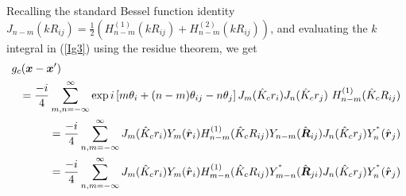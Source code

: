 Recalling the standard Bessel function  identity
${J}_{n-m}(k  R_{ij})=
\frac{1}{2}({H}^{(1)}_{n-m}(k  R_{ij})+ {H}^{(2)}_{n-m}(k  R_{ij}))$, and 
evaluating the $k$ integral in (\ref{Ig3}) using the residue theorem, we get
\begin{eqnarray} \label{Ig4} 
\lefteqn{
g_{c}({\bmi  x} -{\bmi  x}^{\prime} )}\nonumber\\
&&=\frac{-i}{4}
\sum\limits_{ m,n=-\infty }^{ \infty }  \exp i  \left[ m \theta_i + (n-m)
\theta_{ij} -n\theta_j \right]
 {J}_{m}(\hat{K}_{c} r_i) {J}_{n}(\hat{K}_{c} r_j) \
{H}^{(1)}_{n-m}(\hat{K}_{c}R_{ij})\nonumber\\
&&=
{\frac{-i}{4}} \sum\limits_{ n,m=- \infty }^{ \infty } 
{ J}_{ m} (\hat{ K}_{c}{r}_{i}){Y}_{m}({\hat{\bmi r}}_{i}){H}_{n-m}^{(1)}(\hat{ K}_{c}{R}_{ij})
{Y}_{n-m}(\hat{{\bmi R}}_{ij}){J}_{n}(\hat{ K}_{c}{r}_{j}){Y}_{n}^{{}^\ast}
({\hat{\bmi r}}_{j})\nonumber\\
&&=
{\frac{-i}{4}} \sum\limits_{ n,m=- \infty }^{ \infty } 
{ J}_{ m} (\hat{ K}_{c}{r}_{i}){Y}_{m}({\hat{\bmi r}}_{i}){H}_{m-n}^{(1)}(\hat{ K}_{c}{R}_{ij})
{Y}_{m-n}^{{}^\ast}(\hat{{\bmi R}}_{ji}){J}_{n}(\hat{ K}_{c}{r}_{j}){Y}_{n}^{{}^\ast}
({\hat{\bmi r}}_{j})
\end{eqnarray}

